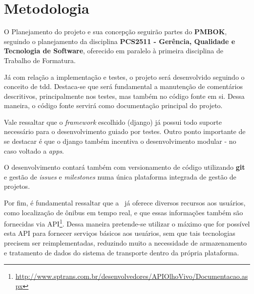 \chapter{Metodologia}\label{chp: metodologia}

O Planejamento do projeto e sua concepção seguirão partes do \textbf{PMBOK}, seguindo o planejamento da disciplina \textbf{PCS2511 - Gerência, Qualidade e Tecnologia de Software}, oferecido em paralelo à primeira disciplina de Trabalho de Formatura.

Já com relação a implementação e testes, o projeto será desenvolvido seguindo o conceito de \gls{tdd}. Destaca-se que será fundamental a manutenção de comentários descritivos, principalmente nos testes, mas também no código fonte em si. Dessa maneira, o código fonte servirá como documentação principal do projeto.

Vale ressaltar que o \textit{framework} escolhido (\gls{django}) já possui todo suporte necessário para o desenvolvimento guiado por testes. Outro ponto importante de se destacar é que o \gls{django} também incentiva o desenvolvimento modular - no caso voltado a \textit{apps}.

O desenvolvimento contará também com versionamento de código utilizando \textbf{git} e gestão de \textit{issues} e \textit{milestones} numa única plataforma integrada de gestão de projetos.

Por fim, é fundamental ressaltar que a \sptrans~já oferece diversos recursos aos usuários, como localização de ônibus em tempo real, e que essas informações também são fornecidas via API\footnote{\url{http://www.sptrans.com.br/desenvolvedores/APIOlhoVivo/Documentacao.aspx}}. Dessa maneira pretende-se utilizar o máximo que for possível esta API para fornecer serviços básicos aos usuários, sem que tais tecnologias precisem ser reimplementadas, reduzindo muito a necessidade de armazenamento e tratamento de dados do sistema de transporte dentro da própria plataforma.